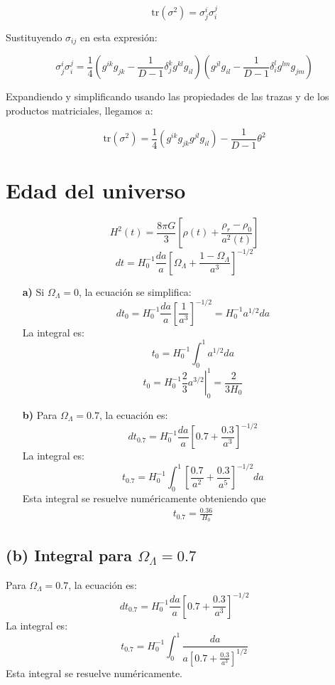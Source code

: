 \documentclass{article}
\begin{document}
\begin{itemize}
    \[
    \text{tr}(\sigma^2) = \sigma_j^i \sigma_i^j
    \]

    Sustituyendo \( \sigma_{ij} \) en esta expresión:

    \[
    \sigma_j^i \sigma_i^j = \frac{1}{4} \left( g^{ik} g_{jk} - \frac{1}{D-1} \delta_j^k g^{kl} g_{il} \right) \left( g^{jl} g_{il} - \frac{1}{D-1} \delta_i^l g^{lm} g_{jm} \right)
    \]

    Expandiendo y simplificando usando las propiedades de las trazas y de los productos matriciales, llegamos a:

    \[
    \text{tr}(\sigma^2) = \frac{1}{4} \left( g^{ik} g_{jk} g^{jl} g_{il} \right) - \frac{1}{D-1} \theta^2
    \]
\end{itemize}








\section{Edad del universo }

\[
H^2(t) = \frac{8\pi G}{3} \left[ \rho(t) + \frac{\rho_r - \rho_0}{a^2(t)} \right]
\]
\[
dt = H_0^{-1} \frac{da}{a} \left[ \Omega_\Lambda + \frac{1 - \Omega_\Lambda}{a^3} \right]^{-1/2}
\]
\begin{enumerate}
  \item[\textbf{a)}] 
    Si \(\Omega_\Lambda = 0\), la ecuación se simplifica:
    \[
    dt_0 = H_0^{-1} \frac{da}{a} \left[ \frac{1}{a^3} \right]^{-1/2} = H_0^{-1} a ^ {1/2} da
  \]
    La integral es:
    \[
    t _{0}  = H_0^{-1} \int_0^1 a^{1/2} da
    \]
    \[
    t _{0}  = \left. H_0^{-1} \frac{2}{3} a ^ {3/2 } \right| _{0}^1 = \frac{2}{3 H_0} 
  \]

  \item[\textbf{b)}] 
    Para \(\Omega_\Lambda = 0.7\), la ecuación es:
    \[
    dt _{0.7}= H_0^{-1} \frac{da}{a} \left[ 0.7 + \frac{0.3}{a^3} \right]^{-1/2}
    \]
    La integral es:
    \[
      t_{0.7} = H_0^{-1} \int_0^1 \left[ \frac{0.7 }{a^2 } + \frac{0.3 }{a^5} \right]^{-1/2} da
    \]
    Esta integral se resuelve numéricamente obteniendo que 
    \begin{gather*}
      t _{0.7 }  = \frac{0.36}{H_0} 
    \end{gather*}

\end{enumerate}

\subsection*{(b) Integral para \(\Omega_\Lambda = 0.7\)}
Para \(\Omega_\Lambda = 0.7\), la ecuación es:
\[
dt _{0.7}= H_0^{-1} \frac{da}{a} \left[ 0.7 + \frac{0.3}{a^3} \right]^{-1/2}
\]
La integral es:
\[
  t_{0.7} = H_0^{-1} \int_0^1 \frac{da}{a \left[ 0.7 + \frac{0.3}{a^3} \right]^{1/2}}
\]
Esta integral se resuelve numéricamente.
\end{document}
